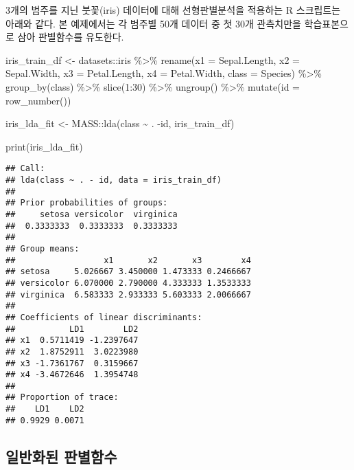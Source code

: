 \documentclass[
]{book}
\newenvironment{Shaded}{\begin{snugshade}}{\end{snugshade}}
\newcommand{\AttributeTok}[1]{\textcolor[rgb]{0.77,0.63,0.00}{#1}}
\newcommand{\DecValTok}[1]{\textcolor[rgb]{0.00,0.00,0.81}{#1}}
\newcommand{\FunctionTok}[1]{\textcolor[rgb]{0.00,0.00,0.00}{#1}}
\newcommand{\NormalTok}[1]{#1}
\newcommand{\OtherTok}[1]{\textcolor[rgb]{0.56,0.35,0.01}{#1}}
\newcommand{\SpecialCharTok}[1]{\textcolor[rgb]{0.00,0.00,0.00}{#1}}
\begin{document}
3개의 범주를 지닌 붓꽃(iris) 데이터에 대해 선형판별분석을 적용하는 R 스크립트는 아래와 같다. 본 예제에서는 각 범주별 50개 데이터 중 첫 30개 관측치만을 학습표본으로 삼아 판별함수를 유도한다.

\begin{Shaded}
\begin{Highlighting}[]
\NormalTok{iris\_train\_df }\OtherTok{\textless{}{-}}\NormalTok{ datasets}\SpecialCharTok{::}\NormalTok{iris }\SpecialCharTok{\%\textgreater{}\%}
  \FunctionTok{rename}\NormalTok{(}\AttributeTok{x1 =}\NormalTok{ Sepal.Length,}
         \AttributeTok{x2 =}\NormalTok{ Sepal.Width,}
         \AttributeTok{x3 =}\NormalTok{ Petal.Length,}
         \AttributeTok{x4 =}\NormalTok{ Petal.Width,}
         \AttributeTok{class =}\NormalTok{ Species) }\SpecialCharTok{\%\textgreater{}\%}
  \FunctionTok{group\_by}\NormalTok{(class) }\SpecialCharTok{\%\textgreater{}\%}
  \FunctionTok{slice}\NormalTok{(}\DecValTok{1}\SpecialCharTok{:}\DecValTok{30}\NormalTok{) }\SpecialCharTok{\%\textgreater{}\%}
  \FunctionTok{ungroup}\NormalTok{() }\SpecialCharTok{\%\textgreater{}\%}
  \FunctionTok{mutate}\NormalTok{(}\AttributeTok{id =} \FunctionTok{row\_number}\NormalTok{())}

\NormalTok{iris\_lda\_fit }\OtherTok{\textless{}{-}}\NormalTok{ MASS}\SpecialCharTok{::}\FunctionTok{lda}\NormalTok{(class }\SpecialCharTok{\textasciitilde{}}\NormalTok{ . }\SpecialCharTok{{-}}\NormalTok{id, iris\_train\_df)}

\FunctionTok{print}\NormalTok{(iris\_lda\_fit)}
\end{Highlighting}
\end{Shaded}

\begin{verbatim}
## Call:
## lda(class ~ . - id, data = iris_train_df)
## 
## Prior probabilities of groups:
##     setosa versicolor  virginica 
##  0.3333333  0.3333333  0.3333333 
## 
## Group means:
##                  x1       x2       x3        x4
## setosa     5.026667 3.450000 1.473333 0.2466667
## versicolor 6.070000 2.790000 4.333333 1.3533333
## virginica  6.583333 2.933333 5.603333 2.0066667
## 
## Coefficients of linear discriminants:
##           LD1        LD2
## x1  0.5711419 -1.2397647
## x2  1.8752911  3.0223980
## x3 -1.7361767  0.3159667
## x4 -3.4672646  1.3954748
## 
## Proportion of trace:
##    LD1    LD2 
## 0.9929 0.0071
\end{verbatim}

\hypertarget{mutliclass-generalized-discriminant-function}{%
\subsection{일반화된 판별함수}\label{mutliclass-generalized-discriminant-function}}
\end{document}
